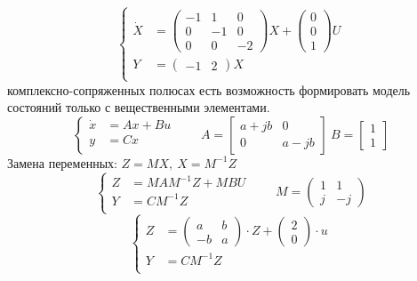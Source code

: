 \[
  \left\{\begin{aligned} 
      \dot X &= \begin{pmatrix} 
        -1 & 1 & 0\\ 0 & -1 & 0 \\ 0 & 0 & -2
      \end{pmatrix}X + \begin{pmatrix} 0 \\ 0 \\ 1 \end{pmatrix}U \\
        Y &= \begin{pmatrix} -1 & 2 \end{pmatrix} X \\
  \end{aligned}\right. 
\] 
 комплексно-сопряженных полюсах есть возможность формировать модель состояний
только с вещественными элементами.
\[
  \left\{\begin{aligned} 
      \dot x &= Ax + Bu\\
      y &= Cx \\
    \end{aligned}\right. \qquad A = \begin{bmatrix} 
      a+jb & 0 \\ 0 & a-jb 
    \end{bmatrix} \ B = \begin{bmatrix} 1 \\ 1 \end{bmatrix} 
\] 
Замена переменных: $Z = MX, \ X = M^{-1}Z$
\[
  \left\{\begin{aligned} 
    Z &= M A M^{-1} Z + MBU\\
    Y &= CM^{-1}Z \\
  \end{aligned}\right. \qquad M = \begin{pmatrix} 1 & 1\\ j & -j \end{pmatrix} 
\] 
\[
  \left\{\begin{aligned} 
      Z &= \begin{pmatrix} a & b \\ -b & a \end{pmatrix}  \cdot Z + 
      \begin{pmatrix} 2 \\ 0 \end{pmatrix}  \cdot u\\
      Y &= CM^{-1}Z \\
  \end{aligned}\right. 
\] 

